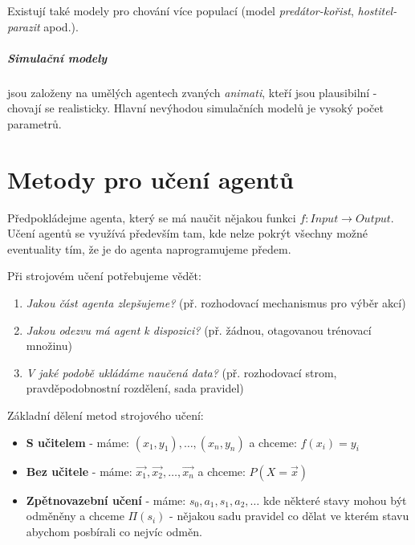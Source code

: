 \documentclass[a4paper]{article}      %
\begin{document}
Existují také modely pro chování více populací (model \emph{predátor-kořist}, \emph{hostitel-parazit} apod.).

\subparagraph{Simulační modely} jsou založeny na umělých agentech zvaných \emph{animati}, kteří jsou plausibilní - chovají se realisticky.
Hlavní nevýhodou simulačních modelů je vysoký počet parametrů.


\section{Metody pro učení agentů}
Předpokládejme agenta, který se má naučit nějakou funkci $f: Input \rightarrow Output$.
Učení agentů se využívá především tam, kde nelze pokrýt všechny možné eventuality tím, že je do agenta naprogramujeme předem.

Při strojovém učení potřebujeme vědět:
\begin{enumerate}
\item \emph{Jakou část agenta zlepšujeme?} (př. rozhodovací mechanismus pro výběr akcí)
\item \emph{Jakou odezvu má agent k dispozici?} (př. žádnou, otagovanou trénovací množinu)
\item \emph{V jaké podobě ukládáme naučená data?} (př. rozhodovací strom, pravděpodobnostní rozdělení, sada pravidel)
\end{enumerate}

Základní dělení metod strojového učení:
\begin{itemize}
\item \textbf{S učitelem} - máme: $(x_1,y_1),\ldots,(x_n,y_n)$ a chceme: $f(x_i)=y_i$ 
\item \textbf{Bez učitele} - máme: $\vec{x_1},\vec{x_2},\ldots,\vec{x_n}$ a chceme: $P(X=\vec{x})$ 
\item \textbf{Zpětnovazební učení} - máme: $s_0,a_1,s_1,a_2,\ldots$ kde některé stavy mohou být odměněny a chceme $\Pi(s_i)$ - nějakou sadu pravidel co dělat ve kterém stavu abychom posbírali co nejvíc odměn.
\end{itemize}
\end{document}

